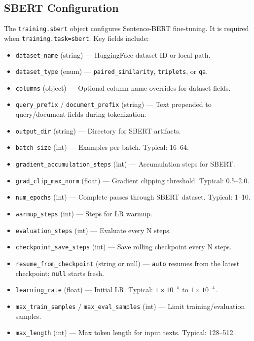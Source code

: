 \subsection{SBERT Configuration}
\label{subsec:sbert-config}

The \texttt{training.sbert} object configures Sentence-BERT fine-tuning. It is required when \texttt{training.task=sbert}. Key fields include:

\begin{itemize}[nosep]
    \item \texttt{dataset\_name} (string) --- HuggingFace dataset ID or local path.
    \item \texttt{dataset\_type} (enum) --- \texttt{paired\_similarity}, \texttt{triplets}, or \texttt{qa}.
    \item \texttt{columns} (object) --- Optional column name overrides for dataset fields.
    \item \texttt{query\_prefix} / \texttt{document\_prefix} (string) --- Text prepended to query/document fields during tokenization.
    \item \texttt{output\_dir} (string) --- Directory for SBERT artifacts.
    \item \texttt{batch\_size} (int) --- Examples per batch. Typical: 16--64.
    \item \texttt{gradient\_accumulation\_steps} (int) --- Accumulation steps for SBERT.
    \item \texttt{grad\_clip\_max\_norm} (float) --- Gradient clipping threshold. Typical: 0.5--2.0.
    \item \texttt{num\_epochs} (int) --- Complete passes through SBERT dataset. Typical: 1--10.
    \item \texttt{warmup\_steps} (int) --- Steps for LR warmup.
    \item \texttt{evaluation\_steps} (int) --- Evaluate every N steps.
    \item \texttt{checkpoint\_save\_steps} (int) --- Save rolling checkpoint every N steps.
    \item \texttt{resume\_from\_checkpoint} (string or null) --- \texttt{auto} resumes from the latest checkpoint; \texttt{null} starts fresh.
    \item \texttt{learning\_rate} (float) --- Initial LR. Typical: $1\times10^{-5}$ to $1\times10^{-4}$.
    \item \texttt{max\_train\_samples} / \texttt{max\_eval\_samples} (int) --- Limit training/evaluation samples.
    \item \texttt{max\_length} (int) --- Max token length for input texts. Typical: 128--512.

\end{itemize}
